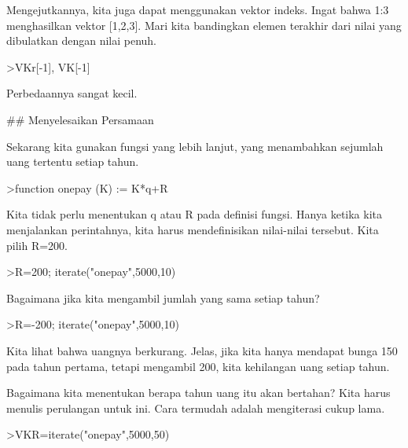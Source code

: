 \documentclass[a4paper,10pt]{article}
\begin{document}
\begin{eulernotebook}
\begin{euleroutput}
  Mengejutkannya, kita juga dapat menggunakan vektor indeks. Ingat bahwa 1:3 menghasilkan vektor [1,2,3]. Mari kita bandingkan elemen terakhir dari nilai yang dibulatkan dengan nilai penuh.
  
\end{euleroutput}
\begin{eulerprompt}
>VKr[-1], VK[-1]
\end{eulerprompt}
\begin{euleroutput}
  
  Perbedaannya sangat kecil.
  
  ## Menyelesaikan Persamaan
  
  Sekarang kita gunakan fungsi yang lebih lanjut, yang menambahkan sejumlah uang tertentu setiap tahun.
  
\end{euleroutput}
\begin{eulerprompt}
>function onepay (K) := K*q+R
\end{eulerprompt}
\begin{euleroutput}
  
  Kita tidak perlu menentukan q atau R pada definisi fungsi. Hanya ketika kita menjalankan perintahnya, kita harus mendefinisikan nilai-nilai tersebut. Kita pilih R=200.
  
\end{euleroutput}
\begin{eulerprompt}
>R=200; iterate("onepay",5000,10)
\end{eulerprompt}
\begin{euleroutput}
  
  Bagaimana jika kita mengambil jumlah yang sama setiap tahun?
  
\end{euleroutput}
\begin{eulerprompt}
>R=-200; iterate("onepay",5000,10)
\end{eulerprompt}
\begin{euleroutput}
  
  Kita lihat bahwa uangnya berkurang. Jelas, jika kita hanya mendapat bunga 150 pada tahun pertama, tetapi mengambil 200, kita kehilangan uang setiap tahun.
  
  Bagaimana kita menentukan berapa tahun uang itu akan bertahan? Kita harus menulis perulangan untuk ini. Cara termudah adalah mengiterasi cukup lama.
  
\end{euleroutput}
\begin{eulerprompt}
>VKR=iterate("onepay",5000,50)
\end{eulerprompt}
\begin{euleroutput}
  

\end{euleroutput}
\end{eulernotebook}
\end{document}
